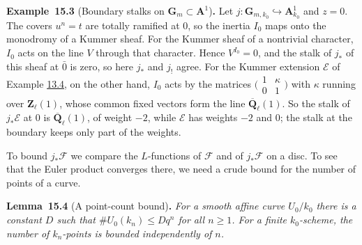 \documentclass[11pt]{article}
\newenvironment{bpstatement}[2]{\par\addvspace{0.6\baselineskip}\noindent\textbf{#1}#2\textbf{.}\enspace\ignorespaces}
  {\par\addvspace{0.4\baselineskip}}
\newenvironment{bpstatementit}[2]{\begin{bpstatement}{#1}{#2}\itshape\ignorespaces}{\end{bpstatement}}
\begin{document}
\label{bp129}%
\begin{bpstatement}{Example~15.3}{ (Boundary stalks on $\mathbf G_m\subset\mathbf A^1$)}
Let \(j:\mathbf G_{m,k_0}\hookrightarrow\mathbf A^1_{k_0}\) and \(z=0\). The covers \(u^n=t\) are totally ramified at \(0\), so the inertia \(I_0\) maps onto the monodromy of a Kummer sheaf. For the Kummer sheaf of a nontrivial character, \(I_0\) acts on the line \(V\) through that character. Hence \(V^{I_0}=0\), and the stalk of \(j_*\) of this sheaf at \(\bar0\) is zero, so here \(j_*\) and \(j_!\) agree. For the Kummer extension \(\mathcal E\) of Example \hyperref[bp17]{13.4}, on the other hand, \(I_0\) acts by the matrices \(\bigl(\begin{smallmatrix}1&\kappa\\0&1\end{smallmatrix}\bigr)\) with \(\kappa\) running over \(\mathbf Z_\ell(1)\), whose common fixed vectors form the line \(\overline{\mathbf Q}_\ell(1)\). So the stalk of \(j_*\mathcal E\) at \(0\) is \(\overline{\mathbf Q}_\ell(1)\), of weight \(-2\), while \(\mathcal E\) has weights \(-2\) and \(0\); the stalk at the boundary keeps only part of the weights.
\end{bpstatement}

\label{bp130}%
To bound \(j_*\mathcal F\) we compare the \(L\)-functions of \(\mathcal F\) and of \(j_*\mathcal F\) on a disc. To see that the Euler product converges there, we need a crude bound for the number of points of a curve.

\label{bp131}%
\begin{bpstatementit}{Lemma~15.4}{ (A point-count bound)}
For a smooth affine curve \(U_0/k_0\) there is a constant \(D\) such that \(\#U_0(k_n)\le Dq^n\) for all \(n\ge1\).  For a finite \(k_0\)-scheme, the number of \(k_n\)-points is bounded independently of \(n\).
\end{bpstatementit}
\end{document}
